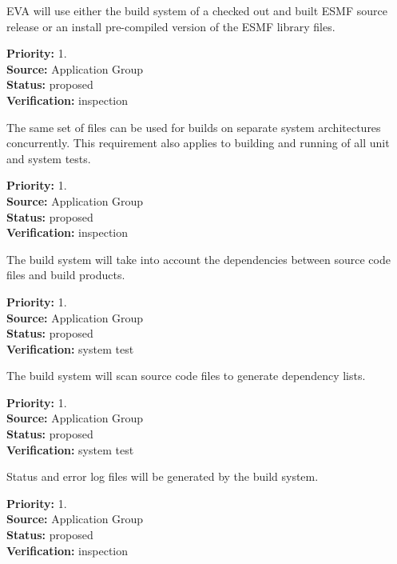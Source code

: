 EVA will use either the build system
of a checked out and built  ESMF source release or 
an install pre-compiled version of the ESMF library files.
\begin{reqlist}
{\bf Priority:} 1. \\
{\bf Source:} Application Group \\
{\bf Status:} proposed \\
{\bf Verification:} inspection
\end{reqlist}


The same set of files can be used for builds on separate 
system architectures concurrently.  This requirement also
applies to building and running of all unit and system
tests.
\begin{reqlist}
{\bf Priority:} 1. \\
{\bf Source:} Application Group \\
{\bf Status:} proposed \\
{\bf Verification:} inspection
\end{reqlist}

The build system will take into account the dependencies 
between source code files and build products.  
\begin{reqlist}
{\bf Priority:} 1. \\
{\bf Source:} Application Group \\
{\bf Status:} proposed \\
{\bf Verification:} system test
\end{reqlist}

The build system will scan source code files to 
generate dependency lists.
\begin{reqlist}
{\bf Priority:} 1. \\
{\bf Source:} Application Group \\
{\bf Status:} proposed \\
{\bf Verification:} system test
\end{reqlist}

Status and error log files will be generated by 
the build system.
\begin{reqlist}
{\bf Priority:} 1. \\
{\bf Source:} Application Group \\
{\bf Status:} proposed \\
{\bf Verification:} inspection
\end{reqlist}

